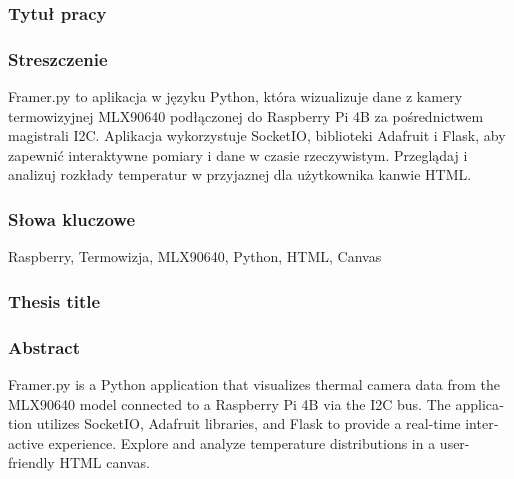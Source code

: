 \documentclass[a4paper,twoside,12pt]{book}
\begin{document}


\cleardoublepage

\rmfamily\normalfont
\pagestyle{empty}



\subsubsection*{Tytuł pracy} 
\Title

\subsubsection*{Streszczenie}  
Framer.py to aplikacja w języku Python, która wizualizuje dane z kamery termowizyjnej MLX90640 podłączonej do Raspberry Pi 4B za pośrednictwem magistrali I2C. Aplikacja wykorzystuje SocketIO, biblioteki Adafruit i Flask, aby zapewnić interaktywne pomiary i dane w czasie rzeczywistym. Przeglądaj i analizuj rozkłady temperatur w przyjaznej dla użytkownika kanwie HTML.

\subsubsection*{Słowa kluczowe} 
Raspberry, Termowizja, MLX90640, Python, HTML, Canvas

\subsubsection*{Thesis title} 
\begin{otherlanguage}{british}
\TitleAlt

\end{otherlanguage}

\subsubsection*{Abstract} 
\begin{otherlanguage}{british}
Framer.py is a Python application that visualizes thermal camera data from the MLX90640 model connected to a Raspberry Pi 4B via the I2C bus. The application utilizes SocketIO, Adafruit libraries, and Flask to provide a real-time interactive experience. Explore and analyze temperature distributions in a user-friendly HTML canvas.
\end{otherlanguage}
\end{document}
